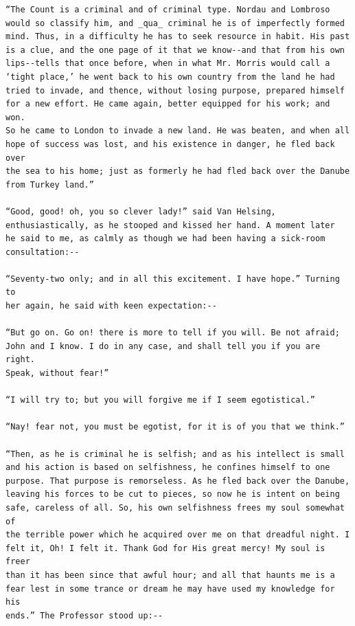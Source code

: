\documentclass{article}
\begin{document}
\begin{verbatim}
“The Count is a criminal and of criminal type. Nordau and Lombroso
would so classify him, and _qua_ criminal he is of imperfectly formed
mind. Thus, in a difficulty he has to seek resource in habit. His past
is a clue, and the one page of it that we know--and that from his own
lips--tells that once before, when in what Mr. Morris would call a
‘tight place,’ he went back to his own country from the land he had
tried to invade, and thence, without losing purpose, prepared himself
for a new effort. He came again, better equipped for his work; and won.
So he came to London to invade a new land. He was beaten, and when all
hope of success was lost, and his existence in danger, he fled back over
the sea to his home; just as formerly he had fled back over the Danube
from Turkey land.”

“Good, good! oh, you so clever lady!” said Van Helsing,
enthusiastically, as he stooped and kissed her hand. A moment later
he said to me, as calmly as though we had been having a sick-room
consultation:--

“Seventy-two only; and in all this excitement. I have hope.” Turning to
her again, he said with keen expectation:--

“But go on. Go on! there is more to tell if you will. Be not afraid;
John and I know. I do in any case, and shall tell you if you are right.
Speak, without fear!”

“I will try to; but you will forgive me if I seem egotistical.”

“Nay! fear not, you must be egotist, for it is of you that we think.”

“Then, as he is criminal he is selfish; and as his intellect is small
and his action is based on selfishness, he confines himself to one
purpose. That purpose is remorseless. As he fled back over the Danube,
leaving his forces to be cut to pieces, so now he is intent on being
safe, careless of all. So, his own selfishness frees my soul somewhat of
the terrible power which he acquired over me on that dreadful night. I
felt it, Oh! I felt it. Thank God for His great mercy! My soul is freer
than it has been since that awful hour; and all that haunts me is a
fear lest in some trance or dream he may have used my knowledge for his
ends.” The Professor stood up:--


\end{verbatim}
\end{document}
